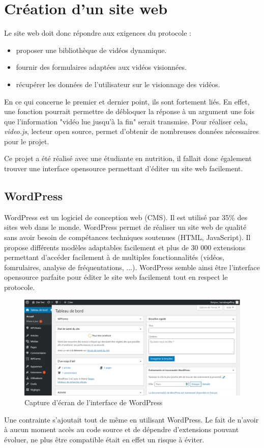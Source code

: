 \section{Création d'un site web}
Le site web doit donc répondre aux exigences du protocole : 
\begin{itemize}
    \item proposer une bibliothèque de vidéos dynamique.
    \item fournir des formulaires adaptées aux vidéos visionnées.
    \item récupérer les données de l'utilisateur sur le visionnage des vidéos.
\end{itemize}
En ce qui concerne le premier et dernier point, ils sont fortement liés. En effet, une fonction pourrait permettre de débloquer la réponse à un argument une fois que l'information "vidéo lue jusqu'à la fin" serait transmise. Pour réaliser cela, \textit{video.js}, lecteur open source, permet d'obtenir de nombreuses données nécessaires pour le projet.

Ce projet a été réalisé avec une étudiante en nutrition, il fallait donc également trouver une interface opensource permettant d'éditer un site web facilement.

\subsection{WordPress}
WordPress est un logiciel de conception web (CMS). Il est utilisé par 35\% des sites web dans le monde. WordPress permet de réaliser un site web de qualité sans avoir besoin de compétances techniques soutenues (HTML, JavaScript). Il propose différents modèles adaptables facilement et plus de 30 000 extensions permettant d'accéder facilement à de multiples fonctionnalités (vidéos, fomrulaires, analyse de fréquentations, ...). WordPress semble ainsi être l'interface opensource parfaite pour éditer le site web facilement tout en respect le protocole.

\begin{figure}[!ht]
    \begin{center}\includegraphics[width=\textwidth]{assets/wp.PNG}
    \end{center}
    \caption{Capture d'écran de l'interface de WordPress}
\end{figure}
Une contrainte s'ajoutait tout de même en utilisant WordPress. Le fait de n'avoir à aucun moment accès au code source et de dépendre d'extensions pouvant évoluer, ne plus être compatible était en effet un risque à éviter.

